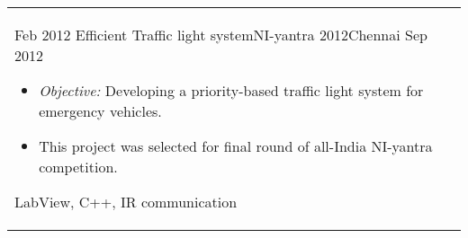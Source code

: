 \begin{longtable}{R{2.5cm}|p{14.8cm}}
	\experience 
	{Feb 2012} {Efficient Traffic light system}{NI-yantra 2012}{Chennai}
	{Sep 2012}	{
		\begin{itemize}
			\item \textit{Objective:} Developing a priority-based traffic light system for emergency vehicles.
			\item This project was selected for final round of all-India NI-yantra competition.
		\end{itemize}	
	}	{LabView, C++, IR communication }

\end{longtable}

%
%
